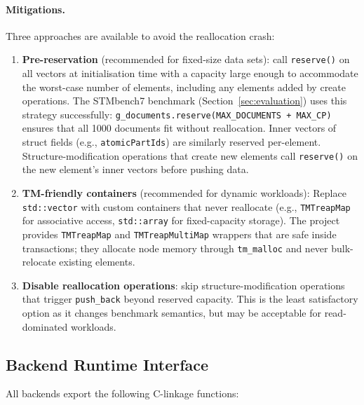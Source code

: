 \documentclass[article,12pt]{article}
\begin{document}
\paragraph{Mitigations.}
Three approaches are available to avoid the reallocation crash:
\begin{enumerate}
\item \textbf{Pre-reservation} (recommended for fixed-size data sets): call
  \texttt{reserve()} on all vectors at initialisation time with a capacity
  large enough to accommodate the worst-case number of elements, including
  any elements added by create operations.  The STMbench7 benchmark
  (Section~\ref{sec:evaluation}) uses this strategy successfully:
  \texttt{g\_documents.reserve(MAX\_DOCUMENTS + MAX\_CP)} ensures that
  all 1000 documents fit without reallocation.  Inner vectors of struct
  fields (e.g., \texttt{atomicPartIds}) are similarly reserved per-element.
  Structure-modification operations that create new elements call
  \texttt{reserve()} on the new element's inner vectors before pushing data.

\item \textbf{TM-friendly containers} (recommended for dynamic workloads):
  Replace \texttt{std::vector} with custom containers that never reallocate
  (e.g., \texttt{TMTreapMap} for associative access, \texttt{std::array} for
  fixed-capacity storage).  The project provides \texttt{TMTreapMap} and
  \texttt{TMTreapMultiMap} wrappers that are safe inside transactions; they
  allocate node memory through \texttt{tm\_malloc} and never bulk-relocate
  existing elements.

\item \textbf{Disable reallocation operations}: skip structure-modification
  operations that trigger \texttt{push\_back} beyond reserved capacity.
  This is the least satisfactory option as it changes benchmark semantics,
  but may be acceptable for read-dominated workloads.
\end{enumerate}

\subsection{Backend Runtime Interface}

All backends export the following C-linkage functions:
\end{document}
